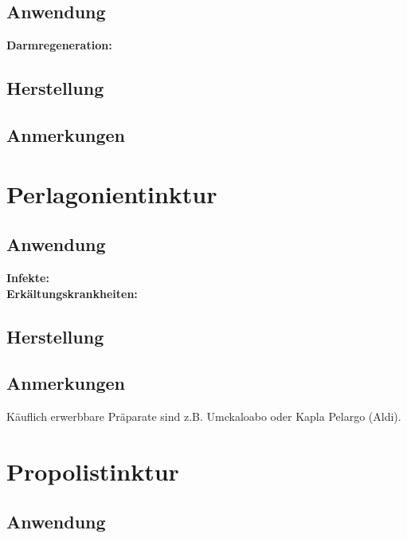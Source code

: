 
\subsection{Anwendung}

\textbf{Darmregeneration:} \\ 

\subsection{Herstellung}

\subsection{Anmerkungen}






\section{Perlagonientinktur}


 
\subsection{Anwendung}


\textbf{Infekte:} \\ 

\textbf{Erkältungskrankheiten:} \\ 


\subsection{Herstellung}

\subsection{Anmerkungen}

Käuflich erwerbbare Präparate sind z.B. Umckaloabo oder Kapla Pelargo (Aldi).






\section{Propolistinktur}

\subsection{Anwendung}

